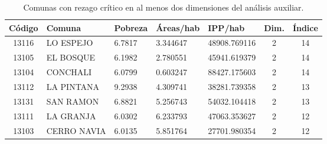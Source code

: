 \begin{table}[htbp]
\centering
\scriptsize
\caption{Comunas con rezago crítico en al menos dos dimensiones del análisis auxiliar.}
\begin{tabular}{|c|p{3.0cm}|p{1.6cm}|p{2.0cm}|p{2.2cm}|c|c|}
\hline
Código & Comuna & Pobreza & Áreas/hab & IPP/hab & Dim. & Índice \\
\hline
13116 & LO ESPEJO & 6.7817 & 3.344647 & 48908.769116 & 2 & 14 \\
13105 & EL BOSQUE & 6.1982 & 2.780551 & 45941.619379 & 2 & 14 \\
13104 & CONCHALI & 6.0799 & 0.603247 & 88427.175603 & 2 & 14 \\
13112 & LA PINTANA & 9.2938 & 4.309741 & 38281.739358 & 2 & 13 \\
13131 & SAN RAMON & 6.8821 & 5.256743 & 54032.104418 & 2 & 13 \\
13111 & LA GRANJA & 6.0302 & 6.233793 & 47063.353627 & 2 & 12 \\
13103 & CERRO NAVIA & 6.0135 & 5.851764 & 27701.980354 & 2 & 12 \\
\hline
\end{tabular}
\end{table}
